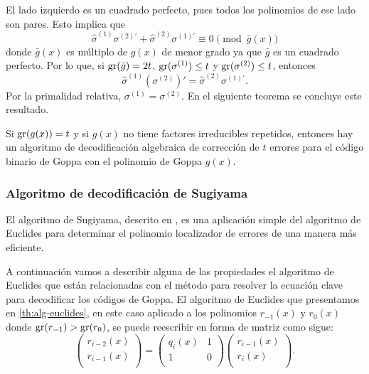 El lado izquierdo es un cuadrado perfecto, pues todos los polinomios de ese lado son pares. Esto implica que
\[
    \hat{\sigma}^{(1)} \sigma^{(2)'} + \hat{\sigma}^{(2)} \sigma^{(1)'} \equiv 0 \pmod{\bar{g}(x)}
\]
donde $\bar{g}(x)$ es múltiplo de $g(x)$ de menor grado ya que $\bar{g}$ es un cuadrado perfecto. Por lo que, si $\operatorname{gr}(\bar{g}) = 2t$, $\operatorname{gr}(\sigma^{(1)}) \leq t$ y $\operatorname{gr}(\sigma^{(2)}) \leq t$, entonces 
\[
    \hat{\sigma}^{(1)} \left( \sigma^{(2)} \right) ' = \hat{\sigma}^{(2)} \sigma^{(1)'}.
\]
Por la primalidad relativa, $\sigma^{(1)} = \sigma^{(2)}$. En el siguiente teorema se concluye este resultado.

\begin{theorem}
    Si $\operatorname{gr}(g(x)) = t$ y si $g(x)$ no tiene factores irreducibles repetidos, entonces hay un algoritmo de decodificación algebraica de corrección de $t$ errores para el código binario de Goppa con el polinomio de Goppa $g(x)$.
\end{theorem}

\subsubsection{Algoritmo de decodificación de Sugiyama}

El algoritmo de Sugiyama, descrito en \cite{Sugiyama_1975}, es una aplicación simple del algoritmo de Euclides para determinar el polinomio localizador de errores de una manera más eficiente.

A continuación vamos a describir alguna de las propiedades el algoritmo de Euclides que están relacionadas con el método para resolver la ecuación clave para decodificar los códigos de Goppa. El algoritmo de Euclides que presentamos en \ref{th:alg-euclides}, en este caso aplicado a los polinomios $r_{-1}(x)$ y $r_0(x)$ donde $\operatorname{gr}(r_{-1}) > \operatorname{gr}(r_0)$, se puede reescribir en forma de matriz como sigue:
\begin{equation}
    \label{alg:euclides-matriz}
    \left( 
        \begin{array}{c}  
            r_{i-2}(x) \\
            r_{i-1}(x) \\
        \end{array} 
    \right)
    = 
    \left( 
        \begin{array}{cc}  
            q_{i}(x) & 1 \\
            1 & 0 \\
        \end{array} 
    \right)
    \left( 
        \begin{array}{c}  
            r_{i-1}(x) \\
            r_{i}(x) \\
        \end{array} 
    \right).
\end{equation}

